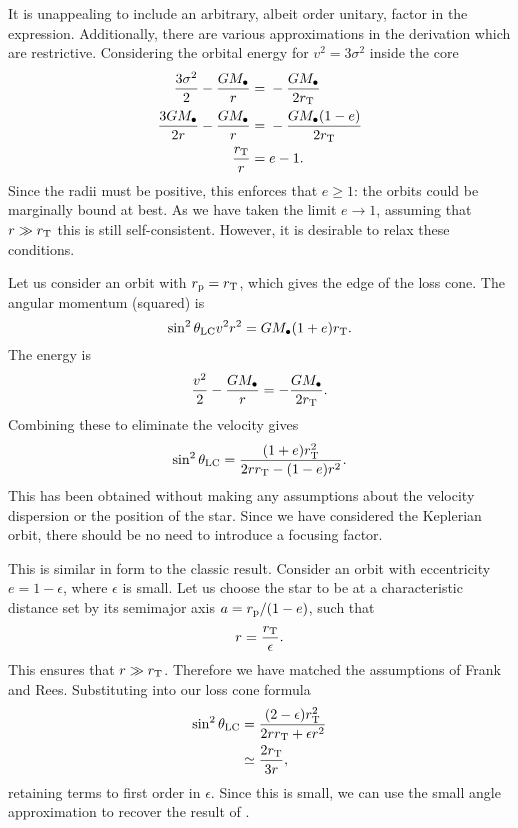 It is unappealing to include an arbitrary, albeit order unitary, factor in the expression. Additionally, there are various approximations in the derivation which are restrictive. Considering the orbital energy for $v^2 = 3\sigma^2$ inside the core
\begin{align}
\frac{3\sigma^2}{2} - \frac{GM_\bullet}{r} = {} & -\frac{GM_\bullet}{2r_\mathrm{T}} \\
\frac{3GM_\bullet}{2r} - \frac{GM_\bullet}{r} = {} & -\frac{GM_\bullet(1-e)}{2r_\mathrm{T}} \\
\frac{r_\mathrm{T}}{r} = {} & e - 1.
\end{align}
Since the radii must be positive, this enforces that $e \geq 1$: the orbits could be marginally bound at best. As we have taken the limit $e \rightarrow 1$, assuming that $r \gg r_\mathrm{T}$ this is still self-consistent. However, it is desirable to relax these conditions.

Let us consider an orbit with $r_\mathrm{p} = r_\mathrm{T}$, which gives the edge of the loss cone. The angular momentum (squared) is
\begin{equation}
\sin^2\theta_\mathrm{LC}v^2r^2 = GM_\bullet(1+e)r_\mathrm{T}.
\end{equation}
The energy is
\begin{equation}
\frac{v^2}{2} - \frac{GM_\bullet}{r} = -\frac{GM_\bullet}{2r_\mathrm{T}}.
\end{equation}
Combining these to eliminate the velocity gives
\begin{equation}
\sin^2\theta_\mathrm{LC} = \frac{(1+e)r_\mathrm{T}^2}{2rr_\mathrm{T} - (1-e)r^2}.
\end{equation}
This has been obtained without making any assumptions about the velocity dispersion or the position of the star. Since we have considered the Keplerian orbit, there should be no need to introduce a focusing factor.

This is similar in form to the classic result. Consider an orbit with eccentricity $e = 1 - \epsilon$, where $\epsilon$ is small. Let us choose the star to be at a characteristic distance set by its semimajor axis $a = r_\mathrm{p}/(1 - e)$, such that
\begin{equation}
r = \frac{r_\mathrm{T}}{\epsilon}.
\end{equation}
This ensures that $r \gg r_\mathrm{T}$. Therefore we have matched the assumptions of Frank and Rees. Substituting into our loss cone formula
\begin{align}
\sin^2\theta_\mathrm{LC} = {} & \frac{(2 - \epsilon)r_\mathrm{T}^2}{2rr_\mathrm{T} + \epsilon r^2} \nonumber \\
 \simeq {} & \frac{2r_\mathrm{T}}{3r},
\end{align}
retaining terms to first order in $\epsilon$. Since this is small, we can use the small angle approximation to recover the result of .
